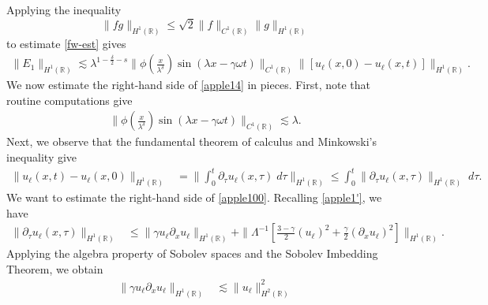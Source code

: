 \documentclass[12pt,reqno]{amsart}
\newcommand{\rr}{\mathbb{R}}
\newcommand{\p}{\partial}
\theoremstyle{plain}  %
\theoremstyle{definition}
\begin{document}
%
%
Applying the inequality 
%
%
\begin{equation*}
\label{applec}
\|fg\|_{H^1(\rr)} \le \sqrt{2} \|f\|_{C^1(\rr)} \|g\|_{H^1(\rr)}
\end{equation*}
%
%
%
%
%
%
%
%
to estimate \eqref{fw-est} gives
%
%
\begin{equation}
\begin{split}
\|E_1\|_{H^1(\rr)} \lesssim \lambda^{1 - \frac{\delta}{2} -s } \|\phi
\left( \frac{x}{\lambda^\delta} \right) \sin (\lambda x - \gamma \omega t)
\|_{C^1(\rr)} \|[u_\ell (x,0) - u_\ell (x,t) ] \|_{H^1(\rr)}.
\label{apple14}
\end{split}
\end{equation}
%
%
We now estimate the right-hand side of \eqref{apple14} in pieces. First, 
note that routine computations give
%
%
\begin{equation}
\begin{split}
\|\phi\left( \frac{x}{\lambda^\delta} \right) \sin(\lambda x - \gamma 
\omega t)
\|_{C^1(\rr)}
\lesssim \lambda.
\label{apple15}
\end{split}
\end{equation}
%
%
Next, we observe that the fundamental 
theorem
of calculus and Minkowski's inequality give
%
%
%
%
\begin{equation}
\begin{split}
\|u_\ell(x,t) - u_\ell(x,0)\|_{H^1(\rr)}
& =  \| \int_0^t \p_\tau
u_\ell(x,\tau) \; d \tau \|_{H^1(\rr)}
 \le \int_0^t \|\p_\tau u_\ell (x,\tau) \|_{H^1(\rr)} \; d \tau.
\label{apple100}
\end{split}
\end{equation}
%
%
We want to estimate the right-hand side of \eqref{apple100}. Recalling
\eqref{apple1'}, we have
%
%
\begin{equation}
\label{apple101}
\begin{split}
 \|\p_\tau u_\ell(x,\tau) \|_{H^1(\rr)}
& \le \|\gamma u_\ell \p_x u_\ell \|_{H^1(\rr)}
 + \|\Lambda^{-1} \left[
\frac{3-\gamma}{2} (u_\ell)^2 + \frac{\gamma}{2} \left( \p_x u_\ell 
\right)^2
\right] \|_{H^1(\rr)}.
\end{split}
\end{equation}
%
%
Applying the algebra property of Sobolev spaces and the Sobolev Imbedding 
Theorem, we obtain
%
%
\begin{equation*}
\begin{split}
\|\gamma u_\ell \p_x u_\ell \|_{H^1(\rr)} &
\lesssim \|u_\ell\|_{H^2(\rr)}^2
\end{split}
\end{equation*}
\end{document}
